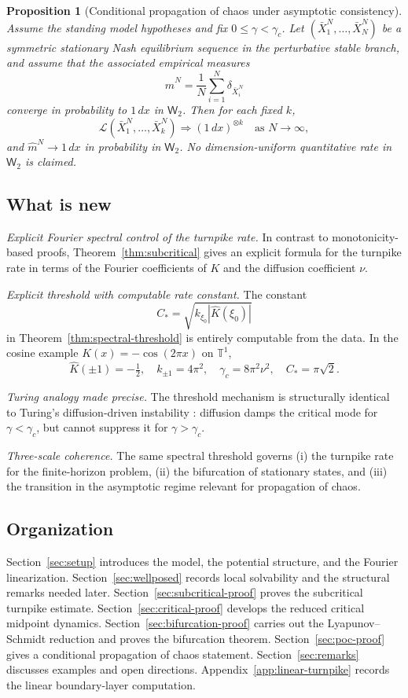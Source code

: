 \documentclass[11pt]{amsart}
\newtheorem{proposition}[theorem]{Proposition}
\theoremstyle{definition}
\theoremstyle{remark}
\newcommand{\To}{\mathbb{T}^1}
\newcommand{\cL}{\mathcal{L}}
\newcommand{\Kh}{\widehat{K}}
\newcommand{\Wt}{\mathsf{W}_2}
\newcommand{\gamc}{\gamma_c}
\begin{document}
\begin{proposition}[Conditional propagation of chaos under asymptotic consistency]
\label{prop:poc}
Assume the standing model hypotheses and fix $0\le \gamma<\gamc$. Let
$(\bar X_1^N,\dots,\bar X_N^N)$ be a symmetric stationary Nash equilibrium sequence in the perturbative stable branch, and assume that the associated empirical measures
\[
\widehat m^N = \frac1N\sum_{i=1}^N\delta_{\bar X_i^N}
\]
converge in probability to $1\,dx$ in $\Wt$. Then for each fixed $k$,
\[
\cL(\bar X_1^N,\dots,\bar X_k^N)\Longrightarrow (1\,dx)^{\otimes k}
\quad\text{as }N\to\infty,
\]
and $\widehat m^N\to 1\,dx$ in probability in $\Wt$.
No dimension-uniform quantitative rate in $\Wt$ is claimed.
\end{proposition}

\subsection{What is new}
\label{sub:new}

\textit{Explicit Fourier spectral control of the turnpike rate.} In contrast to monotonicity-based proofs, Theorem~\ref{thm:subcritical} gives an explicit formula for the turnpike rate in terms of the Fourier coefficients of $K$ and the diffusion coefficient $\nu$.

\textit{Explicit threshold with computable rate constant.}
The constant
\[
C_\ast=\sqrt{k_{\xi_0}|\Kh(\xi_0)|}
\]
in Theorem~\ref{thm:spectral-threshold}
is entirely computable from the data. In the cosine example $K(x)=-\cos(2\pi x)$ on $\To$,
\[
  \Kh(\pm1)=-\tfrac12,\quad k_{\pm1}=4\pi^2,\quad
  \gamc=8\pi^2\nu^2,\quad C_\ast=\pi\sqrt{2}.
\]

\textit{Turing analogy made precise.} The threshold mechanism is structurally identical to Turing's diffusion-driven instability \cite{T52}: diffusion damps the critical mode for $\gamma<\gamc$, but cannot suppress it for $\gamma>\gamc$.

\textit{Three-scale coherence.} The same spectral threshold governs
(i) the turnpike rate for the finite-horizon problem,
(ii) the bifurcation of stationary states, and
(iii) the transition in the asymptotic regime relevant for propagation of chaos.

\subsection{Organization}
\label{sub:org}

Section~\ref{sec:setup} introduces the model, the potential structure, and the Fourier linearization. Section~\ref{sec:wellposed} records local solvability and the structural remarks needed later. Section~\ref{sec:subcritical-proof} proves the subcritical turnpike estimate. Section~\ref{sec:critical-proof} develops the reduced critical midpoint dynamics. Section~\ref{sec:bifurcation-proof} carries out the Lyapunov--Schmidt reduction and proves the bifurcation theorem. Section~\ref{sec:poc-proof} gives a conditional propagation of chaos statement. Section~\ref{sec:remarks} discusses examples and open directions. Appendix~\ref{app:linear-turnpike} records the linear boundary-layer computation.
\end{document}
